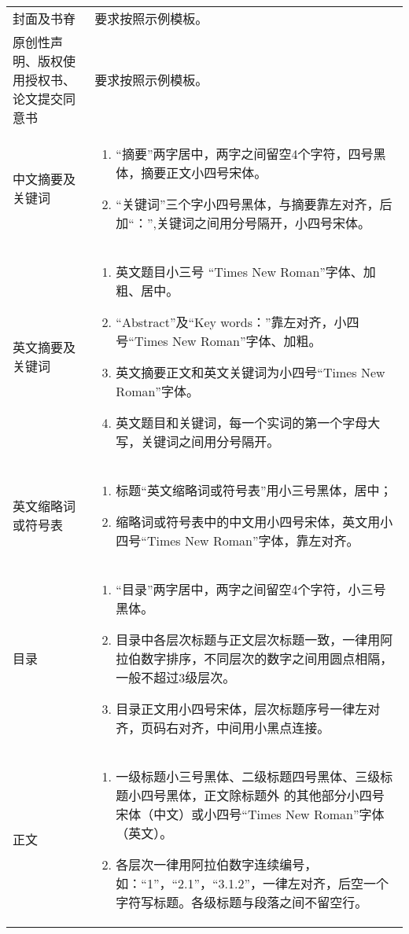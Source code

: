 \begin{center}
\begin{longtable}{m{4cm}m{10cm}}
    封面及书脊 & 要求按照示例模板。\\
    原创性声明、版权使用授权书、论文提交同意书 & 要求按照示例模板。\\
    中文摘要及关键词 & 
    \begin{enumerate}
      \item “摘要”两字居中，两字之间留空4个字符，四号黑体，摘要正文小四号宋体。
      \item “关键词”三个字小四号黑体，与摘要靠左对齐，后加“：”,关键词之间用分号隔开，小四号宋体。
    \end{enumerate}\\
    英文摘要及关键词 & 
    \begin{enumerate}
      \item 英文题目小三号 “Times New Roman”字体、加粗、居中。
      \item “Abstract”及“Key words：”靠左对齐，小四号“Times New Roman”字体、加粗。
      \item 英文摘要正文和英文关键词为小四号“Times New Roman”字体。          
      \item 英文题目和关键词，每一个实词的第一个字母大写，关键词之间用分号隔开。
    \end{enumerate}\\
    英文缩略词或符号表 & 
    \begin{enumerate}
      \item 标题“英文缩略词或符号表”用小三号黑体，居中；
      \item 缩略词或符号表中的中文用小四号宋体，英文用小四号“Times New Roman”字体，靠左对齐。
    \end{enumerate}\\
    目录 & 
    \begin{enumerate}
      \item “目录”两字居中，两字之间留空4个字符，小三号黑体。
      \item 目录中各层次标题与正文层次标题一致，一律用阿拉伯数字排序，不同层次的数字之间用圆点相隔，一般不超过3级层次。        
      \item 目录正文用小四号宋体，层次标题序号一律左对齐，页码右对齐，中间用小黑点连接。
    \end{enumerate}\\
    正文 & 
    \begin{enumerate}
      \item 一级标题小三号黑体、二级标题四号黑体、三级标题小四号黑体，正文除标题外
      的其他部分小四号宋体（中文）或小四号“Times New Roman”字体（英文）。
      \item 各层次一律用阿拉伯数字连续编号，如：“1”，“2.1”，“3.1.2”，一律左对齐，后空一个字符写标题。各级标题与段落之间不留空行。       

\end{enumerate}
\end{longtable}
\end{center}
